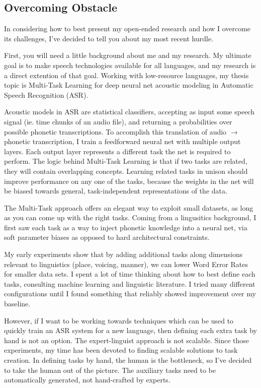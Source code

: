 \documentclass[12pt,a4paper]{article}
\begin{document}
\subsection*{Overcoming Obstacle}

In considering how to best present my open-ended research and how I overcome its challenges, I've decided to tell you about my most recent hurdle.

First, you will need a little background about me and my research. My ultimate goal is to make speech technologies available for all languages, and my research is a direct extention of that goal. Working with low-resource languages, my thesis topic is Multi-Task Learning for deep neural net acoustic modeling in Automatic Speech Recognition (ASR).

Acoustic models in ASR are statistical classifiers, accepting as input some speech signal (ie. time chunks of an audio file), and returning a probabilities over possible phonetic transcriptions. To accomplish this translation of audio $\rightarrow$ phonetic transcription, I train a feedforward neural net with multiple output layers. Each output layer represents a different task the net is required to perform. The logic behind Multi-Task Learning is that if two tasks are related, they will contain overlapping concepts. Learning related tasks in unison should improve performance on any one of the tasks, because the weights in the net will be biased towards general, task-independent representations of the data.

The Multi-Task approach offers an elegant way to exploit small datasets, as long as you can come up with the right tasks. Coming from a lingusitics background, I first saw each task as a way to inject phonetic knowledge into a neural net, via soft parameter biases as opposed to hard architectural constraints.

My early experiments show that by adding additional tasks along dimensions relevant to linguistics (place, voicing, manner), we can lower Word Error Rates for smaller data sets. I spent a lot of time thinking about how to best define each tasks, consulting machine learning and linguistic literature. I tried many different configurations until I found something that reliably showed improvement over my baseline.

However, if I want to be working towards techniques which can be used to quickly train an ASR system for a new language, then defining each extra task by hand is not an option. The expert-linguist approach is not scalable. Since those experiments, my time has been devoted to finding scalable solutions to task creation. In defining tasks by hand, the human is the bottleneck, so I've decided to take the human out of the picture. The auxiliary tasks need to be automatically generated, not hand-crafted by experts.
\end{document}
